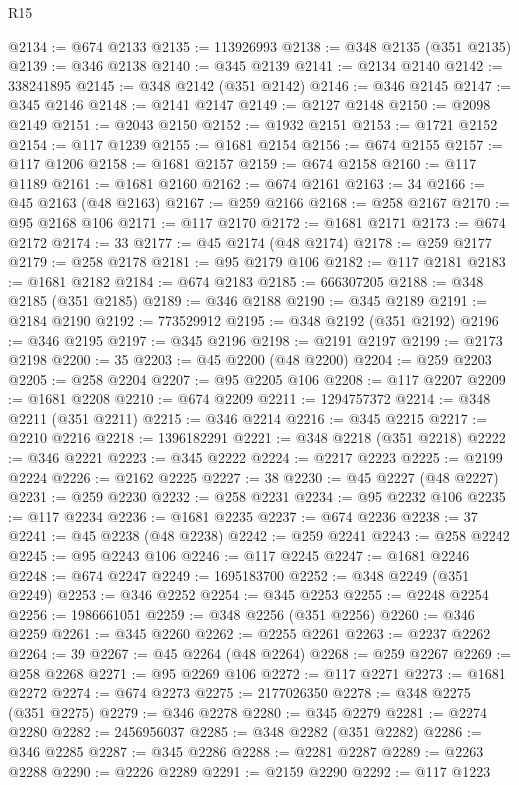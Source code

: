 \begin{lexlean}{R15}
\begin{coremodule}
{{{{{{{{{{{{{{{{{{{{{{{{{{{{{{{{{{{{{{{{{{{{{{{{{{{{{{{{{{{{{{{{{{{{{{@2134 := @674 @2133
@2135 := 113926993
@2138 := @348 @2135 (@351 @2135)
@2139 := @346 @2138
@2140 := @345 @2139
@2141 := @2134 @2140
@2142 := 338241895
@2145 := @348 @2142 (@351 @2142)
@2146 := @346 @2145
@2147 := @345 @2146
@2148 := @2141 @2147
@2149 := @2127 @2148
@2150 := @2098 @2149
@2151 := @2043 @2150
@2152 := @1932 @2151
@2153 := @1721 @2152
@2154 := @117 @1239
@2155 := @1681 @2154
@2156 := @674 @2155
@2157 := @117 @1206
@2158 := @1681 @2157
@2159 := @674 @2158
@2160 := @117 @1189
@2161 := @1681 @2160
@2162 := @674 @2161
@2163 := 34
@2166 := @45 @2163 (@48 @2163)
@2167 := @259 @2166
@2168 := @258 @2167
@2170 := @95 @2168 @106
@2171 := @117 @2170
@2172 := @1681 @2171
@2173 := @674 @2172
@2174 := 33
@2177 := @45 @2174 (@48 @2174)
@2178 := @259 @2177
@2179 := @258 @2178
@2181 := @95 @2179 @106
@2182 := @117 @2181
@2183 := @1681 @2182
@2184 := @674 @2183
@2185 := 666307205
@2188 := @348 @2185 (@351 @2185)
@2189 := @346 @2188
@2190 := @345 @2189
@2191 := @2184 @2190
@2192 := 773529912
@2195 := @348 @2192 (@351 @2192)
@2196 := @346 @2195
@2197 := @345 @2196
@2198 := @2191 @2197
@2199 := @2173 @2198
@2200 := 35
@2203 := @45 @2200 (@48 @2200)
@2204 := @259 @2203
@2205 := @258 @2204
@2207 := @95 @2205 @106
@2208 := @117 @2207
@2209 := @1681 @2208
@2210 := @674 @2209
@2211 := 1294757372
@2214 := @348 @2211 (@351 @2211)
@2215 := @346 @2214
@2216 := @345 @2215
@2217 := @2210 @2216
@2218 := 1396182291
@2221 := @348 @2218 (@351 @2218)
@2222 := @346 @2221
@2223 := @345 @2222
@2224 := @2217 @2223
@2225 := @2199 @2224
@2226 := @2162 @2225
@2227 := 38
@2230 := @45 @2227 (@48 @2227)
@2231 := @259 @2230
@2232 := @258 @2231
@2234 := @95 @2232 @106
@2235 := @117 @2234
@2236 := @1681 @2235
@2237 := @674 @2236
@2238 := 37
@2241 := @45 @2238 (@48 @2238)
@2242 := @259 @2241
@2243 := @258 @2242
@2245 := @95 @2243 @106
@2246 := @117 @2245
@2247 := @1681 @2246
@2248 := @674 @2247
@2249 := 1695183700
@2252 := @348 @2249 (@351 @2249)
@2253 := @346 @2252
@2254 := @345 @2253
@2255 := @2248 @2254
@2256 := 1986661051
@2259 := @348 @2256 (@351 @2256)
@2260 := @346 @2259
@2261 := @345 @2260
@2262 := @2255 @2261
@2263 := @2237 @2262
@2264 := 39
@2267 := @45 @2264 (@48 @2264)
@2268 := @259 @2267
@2269 := @258 @2268
@2271 := @95 @2269 @106
@2272 := @117 @2271
@2273 := @1681 @2272
@2274 := @674 @2273
@2275 := 2177026350
@2278 := @348 @2275 (@351 @2275)
@2279 := @346 @2278
@2280 := @345 @2279
@2281 := @2274 @2280
@2282 := 2456956037
@2285 := @348 @2282 (@351 @2282)
@2286 := @346 @2285
@2287 := @345 @2286
@2288 := @2281 @2287
@2289 := @2263 @2288
@2290 := @2226 @2289
@2291 := @2159 @2290
@2292 := @117 @1223
}}}}}}}}}}}}}}}}}}}}}}}}}}}}}}}}}}}}}}}}}}}}}}}}}}}}}}}}}}}}}}}}}}}}}}
\end{coremodule}
\end{lexlean}
